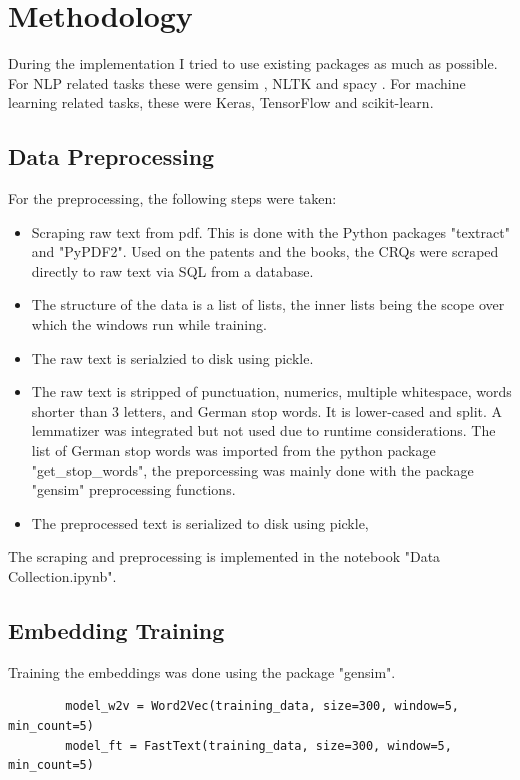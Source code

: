 \documentclass[10pt,a4paper]{article}
\begin{document}
	\section{Methodology}
	
	During the implementation I tried to use existing packages as much as possible. For NLP related tasks these were gensim \cite{rehurek_lrec}, NLTK \cite{Loper:2002:NNL:1118108.1118117} and spacy \cite{spacy2}. For machine learning related tasks, these were Keras, TensorFlow and scikit-learn.
	
	
	\subsection{Data Preprocessing}
	For the preprocessing, the following steps were taken:
	\begin{itemize}
		\item Scraping raw text from pdf. This is done with the Python packages "textract" and "PyPDF2". Used on the patents and the books, the CRQs were scraped directly to raw text via SQL from a database.
		\item The structure of the data is a list of lists, the inner lists being the scope over which the windows run while training.
		\item The raw text is serialzied to disk using pickle.
		\item The raw text is stripped of punctuation, numerics, multiple whitespace, words shorter than 3 letters, and German stop words. It is lower-cased and split. A lemmatizer was integrated but not used due to runtime considerations. The list of German stop words was imported from the python package "get\_stop\_words", the preporcessing was mainly done with the package "gensim" preprocessing functions.
		\item The preprocessed text is serialized to disk using pickle,
	\end{itemize}
    The scraping and preprocessing is implemented in the notebook "Data Collection.ipynb". 
    
	\subsection{Embedding Training}
	
	Training the embeddings was done using the package "gensim". 
	
	\begin{verbatim}
		model_w2v = Word2Vec(training_data, size=300, window=5, min_count=5)
		model_ft = FastText(training_data, size=300, window=5, min_count=5)
	\end{verbatim}
	
\end{document}
